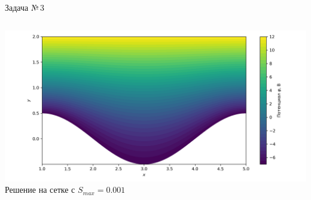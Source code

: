 \documentclass[ignoreonframetext,xcolor=table, unicode, 10pt]{beamer}
\begin{document}
\begin{frame}{Задача №\,3}
\begin{columns}[]
		\hspace*{-22mm}
		\includegraphics[width=1.5\columnwidth]{Test_domain_1_1_sin_mesh_0001_calfem.png}\\
		\hspace*{-3.5mm}Решение на сетке с $S_{max} = 0.001$
	\end{columns}
	
	
\end{frame}
\end{document}
